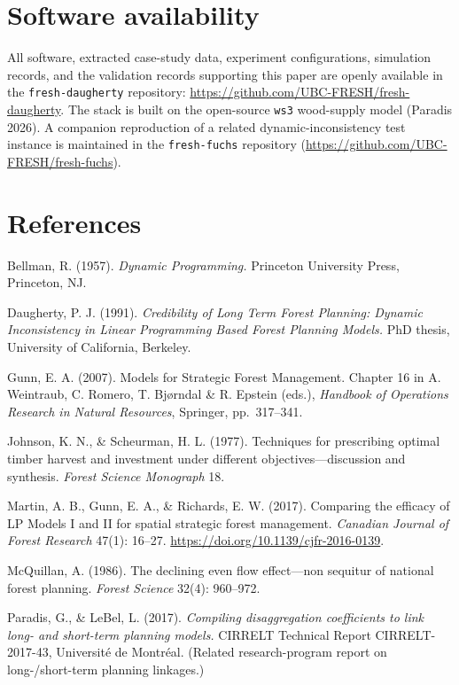 \documentclass[12pt]{article}
\begin{document}
\hypertarget{software-availability}{%
\section{Software availability}\label{software-availability}}

All software, extracted case-study data, experiment configurations, simulation records, and the validation records supporting this paper are openly available in the \texttt{fresh-daugherty} repository: \url{https://github.com/UBC-FRESH/fresh-daugherty}. The stack is built on the open-source \texttt{ws3} wood-supply model (Paradis 2026). A companion reproduction of a related dynamic-inconsistency test instance is maintained in the \texttt{fresh-fuchs} repository (\url{https://github.com/UBC-FRESH/fresh-fuchs}).

\hypertarget{references}{%
\section{References}\label{references}}

Bellman, R. (1957). \emph{Dynamic Programming.} Princeton University Press, Princeton, NJ.

Daugherty, P. J. (1991). \emph{Credibility of Long Term Forest Planning: Dynamic Inconsistency in Linear Programming Based Forest Planning Models.} PhD thesis, University of California, Berkeley.

Gunn, E. A. (2007). Models for Strategic Forest Management. Chapter 16 in A. Weintraub, C. Romero, T. Bjørndal \& R. Epstein (eds.), \emph{Handbook of Operations Research in Natural Resources}, Springer, pp.~317--341.

Johnson, K. N., \& Scheurman, H. L. (1977). Techniques for prescribing optimal timber harvest and investment under different objectives---discussion and synthesis. \emph{Forest Science Monograph} 18.

Martin, A. B., Gunn, E. A., \& Richards, E. W. (2017). Comparing the efficacy of LP Models I and II for spatial strategic forest management. \emph{Canadian Journal of Forest Research} 47(1): 16--27. \url{https://doi.org/10.1139/cjfr-2016-0139}.

McQuillan, A. (1986). The declining even flow effect---non sequitur of national forest planning. \emph{Forest Science} 32(4): 960--972.

Paradis, G., \& LeBel, L. (2017). \emph{Compiling disaggregation coefficients to link long- and short-term planning models.} CIRRELT Technical Report CIRRELT-2017-43, Université de Montréal. (Related research-program report on long-/short-term planning linkages.)
\end{document}

